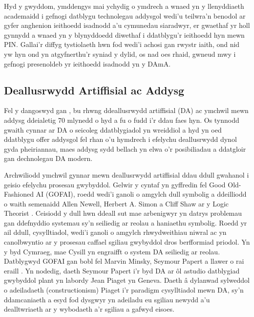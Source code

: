 Hyd y gwyddom, ymddengys mai ychydig o ymdrech a wnaed yn y llenyddiaeth academaidd i gefnogi datblygu technolegau addysgol wedi'u teilwra'n benodol ar gyfer anghenion ieithoedd isadnodd a'u cymunedau siaradwyr, er gwaethaf yr holl gynnydd a wnaed yn y blynyddoedd diwethaf i ddatblygu'r ieithoedd hyn mewn PIN\@. Gallai'r diffyg tystiolaeth hwn fod wedi'i achosi gan rwystr iaith, ond nid yw hyn ond yn atgyfnerthu'r syniad y dylid, os nad oes rhaid, gwneud mwy i gefnogi presenoldeb yr ieithoedd isadnodd yn y DAmA\@.

    \subsection{Deallusrwydd Artiffisial ac Addysg}
Fel y dangoswyd gan \textcite{doroudi_intertwined_2023}, bu rhwng ddeallusrwydd artiffisial (DA) ac ymchwil mewn addysg ddeialetig 70 mlynedd o hyd a fu o fudd i'r ddau faes hyn. Os tynnodd gwaith cynnar ar DA o seicoleg ddatblygiadol yn wreiddiol a hyd yn oed ddatblygu offer addysgol fel rhan o'u hymdrech i efelychu deallusrwydd dynol gyda pheiriannau, maes addysg sydd bellach yn elwa o'r posibiliadau a ddatgloir gan dechnolegau DA modern.

Archwiliodd ymchwil gynnar mewn deallusrwydd artiffisial ddau ddull gwahanol i geisio efelychu prosesau gwybyddol. Gelwir y cyntaf yn gyffredin fel Good Old-Fashioned AI (GOFAI), roedd wedi'i ganoli o amgylch dull symbolig a ddeilliodd o waith semenaidd Allen Newell, Herbert A. Simon a Cliff Shaw ar y Logic Theorist \parencite{newell_logic_1956}. Ceisiodd y dull hwn ddeall sut mae arbenigwyr yn datrys problemau gan ddefnyddio systemau sy'n seiliedig ar reolau a haniaethu symbolig. Roedd yr ail ddull, cysylltiadol, wedi'i ganoli o amgylch rhwydweithiau niwral ac yn canolbwyntio ar y prosesau caffael sgiliau gwybyddol dros berfformiad priodol. Yn y byd Cymraeg, mae Cysill \parencite{hicks_welsh_2004} yn engraifft o system DA seiliedig ar reolau. Datblygwyd GOFAI gan bobl fel Marvin Minsky, Seymour Papert a llawer o rai eraill \parencite{doroudi_intertwined_2023}. Yn nodedig, daeth Seymour Papert i'r byd DA ar ôl astudio datblygiad gwybyddol plant yn labordy Jean Piaget yn Geneva. Daeth â dylanwad sylweddol o adeiladaeth (constructionism) Piaget i'r paradigm cysylltiadol mewn DA, sy'n ddamcaniaeth a esyd fod dysgwyr yn adeiladu eu sgiliau newydd a'u dealltwriaeth ar y wybodaeth a'r sgiliau a gafwyd eisoes.

